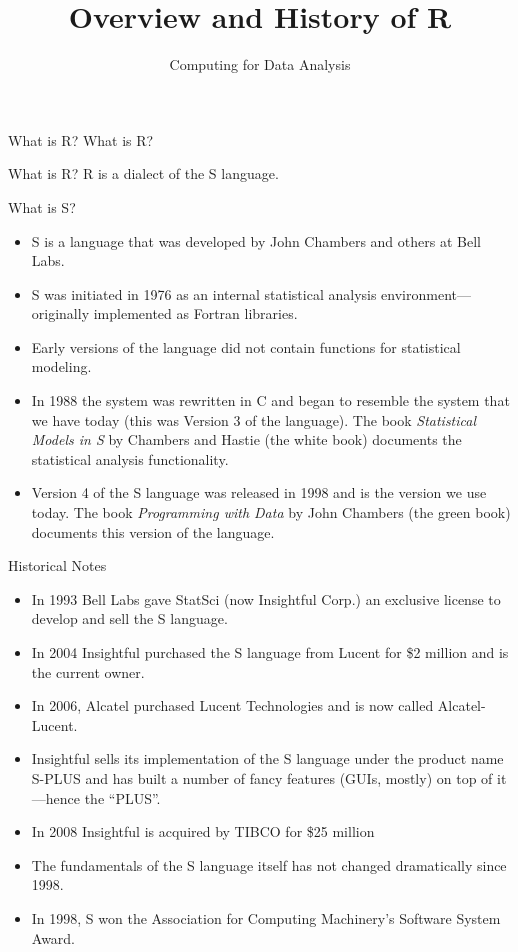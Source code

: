 \documentclass[aspectratio=169]{beamer}
\title[Overview and History of R]{Overview and History of R}
\date{Computing for Data Analysis}
\begin{document}
\begin{frame}
  \titlepage
\end{frame}

\begin{frame}{What is R?}
What is R?
\end{frame}


\begin{frame}{What is R?}
R is a dialect of the S language.
\end{frame}

\begin{frame}{What is S?}
\begin{itemize}
\item
S is a language that was developed by John Chambers and others at Bell
Labs.
\item
S was initiated in 1976 as an internal statistical analysis
environment---originally implemented as Fortran libraries.
\item
Early versions of the language did not contain functions for
statistical modeling.
\item
In 1988 the system was rewritten in C and began to resemble the system
that we have today (this was Version 3 of the language).  The book
\textit{Statistical Models in S} by Chambers and Hastie (the white 
book) documents the statistical analysis functionality.
\item
Version 4 of the S language was released in 1998 and is the version we
use today.  The book \textit{Programming with Data} by John Chambers
(the green book) documents this version of the language.
\end{itemize}
\end{frame}

\begin{frame}{Historical Notes}
\begin{itemize}
\item
In 1993 Bell Labs gave StatSci (now Insightful Corp.) an exclusive
license to develop and sell the S language.
\item
In 2004 Insightful purchased the S language from Lucent for \$2
million and is the current owner.
\item
In 2006, Alcatel purchased Lucent Technologies and is now called
Alcatel-Lucent.
\item
Insightful sells its implementation of the S language under the
product name S-PLUS and has built a number of fancy features (GUIs,
mostly) on top of it---hence the ``PLUS''.
\item
In 2008 Insightful is acquired by TIBCO for \$25 million
\item
The fundamentals of the S language itself has not changed dramatically
since 1998.
\item
In 1998, S won the Association for Computing Machinery's Software
System Award.
\end{itemize}
\end{frame}
\end{document}
